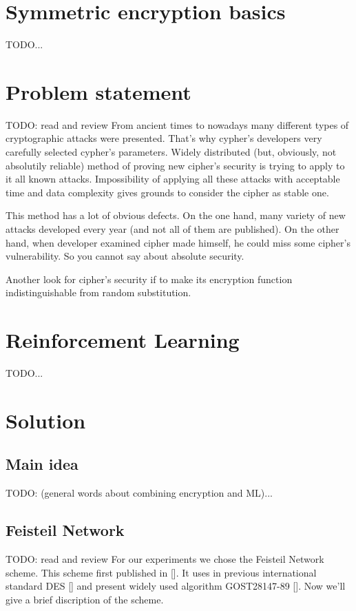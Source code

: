 \documentclass{article}
\begin{document}
\section{Symmetric encryption basics}
TODO...



\section{Problem statement}
TODO: read and review
From ancient times to nowadays 
many different types of 
cryptographic attacks were presented.
That's why cypher's developers very carefully 
selected cypher's parameters. 
Widely distributed (but, obviously, 
not absolutily reliable)
method of proving new cipher's security is 
trying to apply to it all 
known attacks. Impossibility
of applying all these attacks 
with acceptable time and data complexity
gives grounds to consider the cipher as
stable one. 

This method has a lot of 
obvious defects. 
On the one hand, many variety 
of new attacks developed 
every year (and not all of them 
are published). On the other hand, 
when developer examined cipher made
himself, he could miss some 
cipher's vulnerability. So 
you cannot say about 
absolute security.

Another look for cipher's security
if to make its encryption function 
indistinguishable from 
random substitution. 



\section{Reinforcement Learning}
TODO...



\section{Solution}
\subsection{Main idea}
TODO: (general words about combining encryption and ML)...

\subsection{Feisteil Network}
TODO: read and review
For our experiments we chose the 
Feisteil Network scheme. This scheme 
first published in []. It uses in previous 
international standard DES [] and present
widely used algorithm GOST28147-89 []. 
Now we'll give a brief discription of the scheme.
\end{document}
